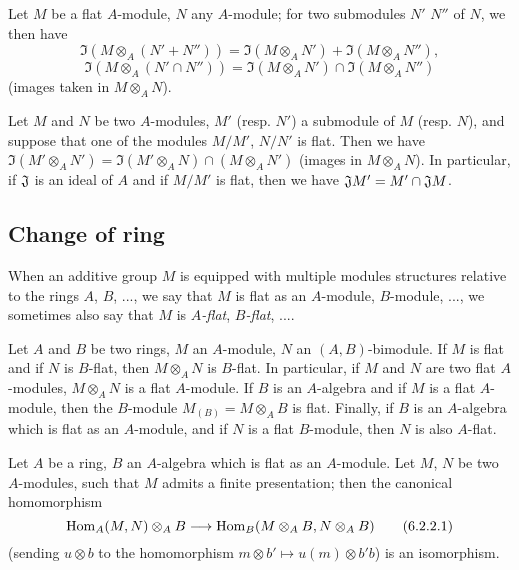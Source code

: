\begin{env}[6.1.3]
\label{0.6.1.3}
Let $M$ be a flat $A$-module, $N$ any $A$-module; for two submodules $N'$ $N''$ of $N$, we then have
\[
  \Im(M\otimes_A(N'+N''))=\Im(M\otimes_A N')+\Im(M\otimes_A N''),
\]
\[
  \Im(M\otimes_A(N'\cap N''))=\Im(M\otimes_A N')\cap\Im(M\otimes_A N'')
\]
(images taken in $M\otimes_A N$).
\end{env}

\begin{env}[6.1.4]
\label{0.6.1.4}
Let $M$ and $N$ be two $A$-modules, $M'$ (resp. $N'$) a submodule of $M$ (resp. $N$), and suppose that one of the modules $M/M'$, $N/N'$ is flat.
Then we have $\Im(M'\otimes_A N')=\Im(M'\otimes_A N)\cap(M\otimes_A N')$ (images in $M\otimes_A N$).
In particular, if $\mathfrak{J}$ is an ideal of $A$ and if $M/M'$ is flat, then we have $\mathfrak{J}M'=M'\cap\mathfrak{J}M$.
\end{env}

\subsection{Change of ring}
\label{subsection:change-of-ring}

When an additive group $M$ is equipped with multiple modules structures relative
to the rings $A$, $B$, ..., we say that $M$ is flat as an $A$-module,
$B$-module, ..., we sometimes also say that $M$ is \emph{$A$-flat},
\emph{$B$-flat}, ....

\begin{env}[6.2.1]
\label{0.6.2.1}
Let $A$ and $B$ be two rings, $M$ an $A$-module, $N$ an $(A,B)$-bimodule. If $M$
is flat and if $N$ is $B$-flat, then $M\otimes_A N$ is $B$-flat. In particular,
if $M$ and $N$ are two flat $A$-modules, $M\otimes_A N$ is a flat $A$-module. If
$B$ is an $A$-algebra and if $M$ is
a flat $A$-module, then the $B$-module $M_{(B)}=M\otimes_A B$ is flat. Finally,
if $B$ is an $A$-algebra which is flat as an $A$-module, and if $N$ is a flat
$B$-module, then $N$ is also $A$-flat.
\end{env}

\begin{env}[6.2.2]
\label{0.6.2.2}
Let $A$ be a ring, $B$ an $A$-algebra which is flat as an $A$-module. Let $M$,
$N$ be two $A$-modules, such that $M$ admits a finite presentation; then the
canonical homomorphism
\[
  \Hom_A(M,N)\otimes_A B\to\Hom_B(M\otimes_A B,N\otimes_A B)
  \tag{6.2.2.1}
\]
(sending $u\otimes b$ to the homomorphism $m\otimes b'\mapsto u(m)\otimes b' b$) is an isomorphism.
\end{env}

